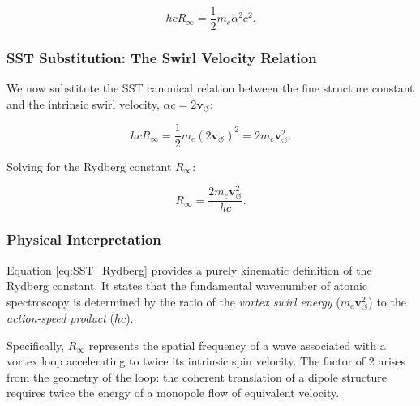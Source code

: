 \documentclass[10pt,reprint,aps,onecolumn,nofootinbib]{revtex4-2}
\begin{document}
            \begin{equation}
                hcR_\infty = \frac{1}{2} m_e \alpha^2 c^2.
            \end{equation}

        \subsubsection*{SST Substitution: The Swirl Velocity Relation}

            We now substitute the SST canonical relation between the fine structure
            constant and the intrinsic swirl velocity, $\alpha c = 2 \mathbf{v}_{\!\boldsymbol{\circlearrowleft}}$:

            \begin{equation}
                hcR_\infty = \frac{1}{2} m_e (2 \mathbf{v}_{\!\boldsymbol{\circlearrowleft}})^2
                = 2 m_e \mathbf{v}_{\!\boldsymbol{\circlearrowleft}}^2.
            \end{equation}

            Solving for the Rydberg constant $R_\infty$:

            \begin{equation}
                R_\infty = \frac{2 m_e \mathbf{v}_{\!\boldsymbol{\circlearrowleft}}^2}{hc}.
                \label{eq:SST_Rydberg}
            \end{equation}

        \subsubsection*{Physical Interpretation}

            Equation \eqref{eq:SST_Rydberg} provides a purely kinematic definition
            of the Rydberg constant. It states that the fundamental wavenumber of
            atomic spectroscopy is determined by the ratio of the \emph{vortex
    swirl energy} ($m_e \mathbf{v}_{\!\boldsymbol{\circlearrowleft}}^2$) to the \emph{action-speed product} ($hc$).

            Specifically, $R_\infty$ represents the spatial frequency of a wave
            associated with a vortex loop accelerating to twice its intrinsic spin
            velocity. The factor of 2 arises from the geometry of the loop: the
            coherent translation of a dipole structure requires twice the energy
            of a monopole flow of equivalent velocity.
\end{document}
